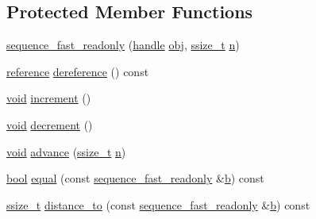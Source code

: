 \subsection*{Protected Member Functions}
\begin{DoxyCompactItemize}
\item 
\mbox{\hyperlink{classsequence__fast__readonly_aadd473034fbf872253a773156515da81}{sequence\+\_\+fast\+\_\+readonly}} (\mbox{\hyperlink{classhandle}{handle}} \mbox{\hyperlink{_s_d_l__opengl__glext_8h_a0c0d4701a6c89f4f7f0640715d27ab26}{obj}}, \mbox{\hyperlink{detail_2common_8h_ac430d16fc097b3bf0a7469cfd09decda}{ssize\+\_\+t}} \mbox{\hyperlink{_s_d_l__opengl__glext_8h_ae2b4646468bc89d0ba646f5cf838e051}{n}})
\item 
\mbox{\hyperlink{classsequence__fast__readonly_a7b285c12cc5332e8fc7998bcab092fa7}{reference}} \mbox{\hyperlink{classsequence__fast__readonly_a66ee58d3a059273dffe9dc0cf76a9550}{dereference}} () const
\item 
\mbox{\hyperlink{_s_d_l__opengles2__gl2ext_8h_ae5d8fa23ad07c48bb609509eae494c95}{void}} \mbox{\hyperlink{classsequence__fast__readonly_a36b3faf2c60a135e8245d7bf8d922000}{increment}} ()
\item 
\mbox{\hyperlink{_s_d_l__opengles2__gl2ext_8h_ae5d8fa23ad07c48bb609509eae494c95}{void}} \mbox{\hyperlink{classsequence__fast__readonly_a7f31daab2a88f9120f06c0bc140ad4af}{decrement}} ()
\item 
\mbox{\hyperlink{_s_d_l__opengles2__gl2ext_8h_ae5d8fa23ad07c48bb609509eae494c95}{void}} \mbox{\hyperlink{classsequence__fast__readonly_a7ffa2a811265609444262806136b7204}{advance}} (\mbox{\hyperlink{detail_2common_8h_ac430d16fc097b3bf0a7469cfd09decda}{ssize\+\_\+t}} \mbox{\hyperlink{_s_d_l__opengl__glext_8h_ae2b4646468bc89d0ba646f5cf838e051}{n}})
\item 
\mbox{\hyperlink{asdl_8h_af6a258d8f3ee5206d682d799316314b1}{bool}} \mbox{\hyperlink{classsequence__fast__readonly_afcbe394740b9209db9a28034e5483794}{equal}} (const \mbox{\hyperlink{classsequence__fast__readonly}{sequence\+\_\+fast\+\_\+readonly}} \&\mbox{\hyperlink{_s_d_l__opengl__glext_8h_a0f71581a41fd2264c8944126dabbd010}{b}}) const
\item 
\mbox{\hyperlink{detail_2common_8h_ac430d16fc097b3bf0a7469cfd09decda}{ssize\+\_\+t}} \mbox{\hyperlink{classsequence__fast__readonly_a943d3956a923d5e3bbe3e1e944a20699}{distance\+\_\+to}} (const \mbox{\hyperlink{classsequence__fast__readonly}{sequence\+\_\+fast\+\_\+readonly}} \&\mbox{\hyperlink{_s_d_l__opengl__glext_8h_a0f71581a41fd2264c8944126dabbd010}{b}}) const
\end{DoxyCompactItemize}


